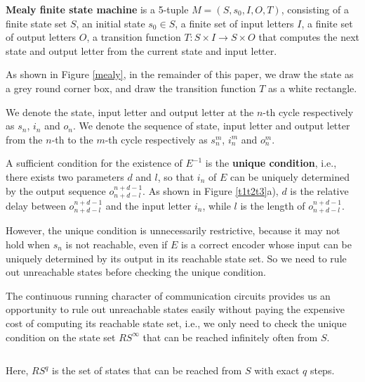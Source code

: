 \documentclass[journal]{IEEEtran}
\begin{document}
\begin{definition11}\label{MealyFSM}%
\textbf{Mealy finite state machine} is a 5-tuple $M=(S,s_0,I,O,T)$,
consisting of a finite state set $S$,
an initial state $s_0\in S$,
a finite set of input letters $I$,
a finite set of output letters $O$,
a transition function $T: S\times I\to S\times O$ that computes the next state and output letter from the current state and input letter.
\end{definition11}

As shown in Figure \ref{mealy},
in the remainder of this paper,
we draw the state as a grey round corner box,
and draw the transition function $T$ as a white rectangle.

We denote the state, input letter and output letter at the $n$-th cycle respectively as $s_n$, $i_n$ and $o_n$.
We denote the sequence of state, input letter and output letter from the $n$-th to the $m$-th cycle respectively as $s_n^m$, $i_n^m$ and $o_n^m$.

A sufficient condition for the existence of $E^{-1}$ is the \textbf{unique condition},
i.e.,
there exists two parameters $d$ and $l$,
so that $i_n$ of $E$ can be uniquely determined by the output sequence $o_{n+d-l}^{n+d-1}$.
As shown in Figure \ref{t1t2t3}a),
$d$ is the relative delay between $o_{n+d-l}^{n+d-1}$ and the input letter $i_n$,
while $l$ is the length of $o_{n+d-l}^{n+d-1}$.

However,
the unique condition is unnecessarily restrictive,
because it may not hold when $s_n$ is not reachable,
even if $E$ is a correct encoder whose input can be uniquely determined by its output in its reachable state set.
So we need to rule out unreachable states before checking the unique condition.

The continuous running character of communication circuits provides us an opportunity to rule out unreachable states easily without paying the expensive cost of computing its reachable state set,
i.e.,
we only need to check the unique condition on the state set $RS^{\infty}$ that can be reached infinitely often from $S$.

\begin{equation}
\end{equation}
\begin{equation}\label{rse}
\end{equation}

Here,
$RS^{q}$ is the set of states that can be reached from $S$ with exact $q$ steps.
\end{document}
